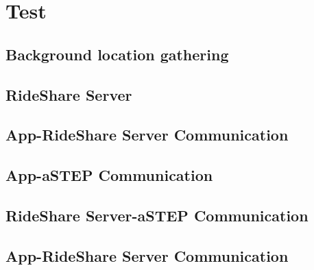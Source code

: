 \section{Test}


\subsection{Background location gathering}


\subsection{RideShare Server}


\subsection{App-RideShare Server Communication}


\subsection{App-aSTEP Communication}


\subsection{RideShare Server-aSTEP Communication}


\subsection{App-RideShare Server Communication}

